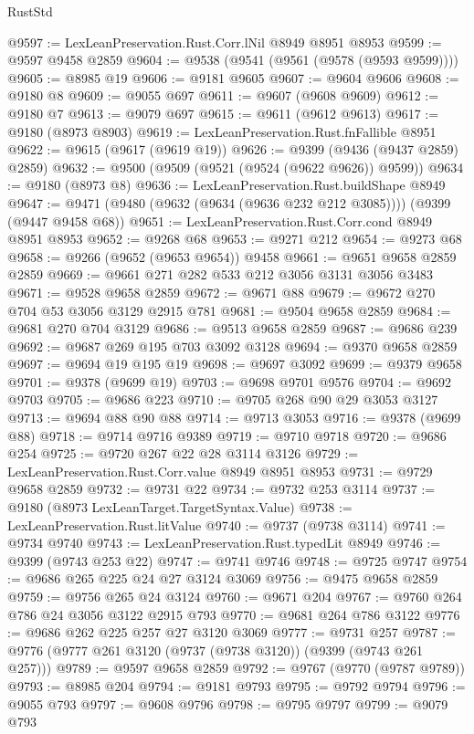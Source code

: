 \begin{lexlean}{RustStd}
\begin{coremodule}
@9597 := LexLeanPreservation.Rust.Corr.lNil @8949 @8951 @8953
@9599 := @9597 @9458 @2859
@9604 := @9538 (@9541 (@9561 (@9578 (@9593 @9599))))
@9605 := @8985 @19
@9606 := @9181 @9605
@9607 := @9604 @9606
@9608 := @9180 @8
@9609 := @9055 @697
@9611 := @9607 (@9608 @9609)
@9612 := @9180 @7
@9613 := @9079 @697
@9615 := @9611 (@9612 @9613)
@9617 := @9180 (@8973 @8903)
@9619 := LexLeanPreservation.Rust.fnFallible @8951
@9622 := @9615 (@9617 (@9619 @19))
@9626 := @9399 (@9436 (@9437 @2859) @2859)
@9632 := @9500 (@9509 (@9521 (@9524 (@9622 @9626)) @9599))
@9634 := @9180 (@8973 @8)
@9636 := LexLeanPreservation.Rust.buildShape @8949
@9647 := @9471 (@9480 (@9632 (@9634 (@9636 @232 @212 @3085)))) (@9399 (@9447 @9458 @68))
@9651 := LexLeanPreservation.Rust.Corr.cond @8949 @8951 @8953
@9652 := @9268 @68
@9653 := @9271 @212
@9654 := @9273 @68
@9658 := @9266 (@9652 (@9653 @9654)) @9458
@9661 := @9651 @9658 @2859 @2859
@9669 := @9661 @271 @282 @533 @212 @3056 @3131 @3056 @3483
@9671 := @9528 @9658 @2859
@9672 := @9671 @88
@9679 := @9672 @270 @704 @53 @3056 @3129 @2915 @781
@9681 := @9504 @9658 @2859
@9684 := @9681 @270 @704 @3129
@9686 := @9513 @9658 @2859
@9687 := @9686 @239
@9692 := @9687 @269 @195 @703 @3092 @3128
@9694 := @9370 @9658 @2859
@9697 := @9694 @19 @195 @19
@9698 := @9697 @3092
@9699 := @9379 @9658
@9701 := @9378 (@9699 @19)
@9703 := @9698 @9701 @9576
@9704 := @9692 @9703
@9705 := @9686 @223
@9710 := @9705 @268 @90 @29 @3053 @3127
@9713 := @9694 @88 @90 @88
@9714 := @9713 @3053
@9716 := @9378 (@9699 @88)
@9718 := @9714 @9716 @9389
@9719 := @9710 @9718
@9720 := @9686 @254
@9725 := @9720 @267 @22 @28 @3114 @3126
@9729 := LexLeanPreservation.Rust.Corr.value @8949 @8951 @8953
@9731 := @9729 @9658 @2859
@9732 := @9731 @22
@9734 := @9732 @253 @3114
@9737 := @9180 (@8973 LexLeanTarget.TargetSyntax.Value)
@9738 := LexLeanPreservation.Rust.litValue
@9740 := @9737 (@9738 @3114)
@9741 := @9734 @9740
@9743 := LexLeanPreservation.Rust.typedLit @8949
@9746 := @9399 (@9743 @253 @22)
@9747 := @9741 @9746
@9748 := @9725 @9747
@9754 := @9686 @265 @225 @24 @27 @3124 @3069
@9756 := @9475 @9658 @2859
@9759 := @9756 @265 @24 @3124
@9760 := @9671 @204
@9767 := @9760 @264 @786 @24 @3056 @3122 @2915 @793
@9770 := @9681 @264 @786 @3122
@9776 := @9686 @262 @225 @257 @27 @3120 @3069
@9777 := @9731 @257
@9787 := @9776 (@9777 @261 @3120 (@9737 (@9738 @3120)) (@9399 (@9743 @261 @257)))
@9789 := @9597 @9658 @2859
@9792 := @9767 (@9770 (@9787 @9789))
@9793 := @8985 @204
@9794 := @9181 @9793
@9795 := @9792 @9794
@9796 := @9055 @793
@9797 := @9608 @9796
@9798 := @9795 @9797
@9799 := @9079 @793

\end{coremodule}
\end{lexlean}
